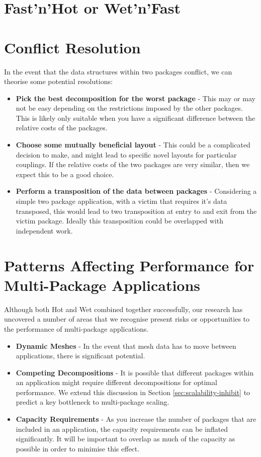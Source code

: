 \documentclass[runningheads,a4paper]{llncs}
\begin{document}
\section{Fast'n'Hot or Wet'n'Fast}


\section{Conflict Resolution}

In the event that the data structures within two packages conflict, we can theorise some potential resolutions:

\begin{itemize}
  \item \textbf{Pick the best decomposition for the worst package} - This may or may not be easy depending on the restrictions imposed by the other packages. This is likely only suitable when you have a significant difference between the relative costs of the packages.
  \item \textbf{Choose some mutually beneficial layout} - This could be a complicated decision to make, and might lead to specific novel layouts for particular couplings. If the relative costs of the two packages are very similar, then we expect this to be a good choice.
  \item \textbf{Perform a transposition of the data between packages} - Considering a simple two package application, with a victim that requires it's data transposed, this would lead to two transposition at entry to and exit from the victim package. Ideally this transposition could be overlapped with independent work.
\end{itemize}

\section{Patterns Affecting Performance for Multi-Package Applications}

Although both Hot and Wet combined together successfully, our research has uncovered a number of areas that we recognise present risks or opportunities to the performance of multi-package applications. 

\begin{itemize}
  \item \textbf{Dynamic Meshes} - In the event that mesh data has to move between applications, there is significant potential.
  \item \textbf{Competing Decompositions} - It is possible that different packages within an application might require different decompositions for optimal performance. We extend this discussion in Section \ref{sec:scalability-inhibit} to predict a key bottleneck to multi-package scaling.
  \item \textbf{Capacity Requirements} - As you increase the number of packages that are included in an application, the capacity requirements can be inflated significantly. It will be important to overlap as much of the capacity as possible in order to minimise this effect.
\end{itemize}
\end{document}
